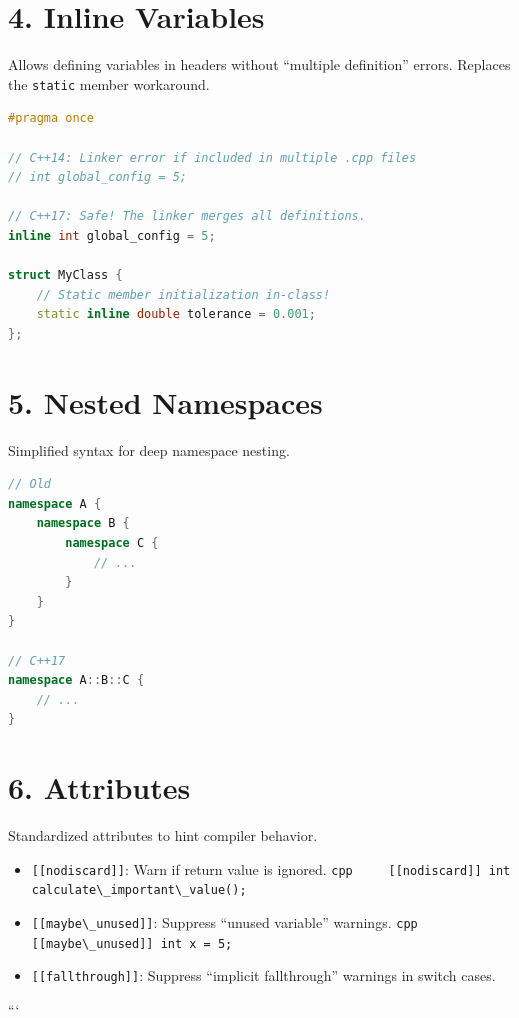 \hypertarget{inline-variables}{%
\section{4. Inline Variables}\label{inline-variables}}

Allows defining variables in headers without ``multiple definition''
errors. Replaces the \passthrough{\lstinline!static!} member workaround.

\begin{lstlisting}[language={C++}]
#pragma once

// C++14: Linker error if included in multiple .cpp files
// int global_config = 5; 

// C++17: Safe! The linker merges all definitions.
inline int global_config = 5; 

struct MyClass {
    // Static member initialization in-class!
    static inline double tolerance = 0.001;
};
\end{lstlisting}

\hypertarget{nested-namespaces}{%
\section{5. Nested Namespaces}\label{nested-namespaces}}

Simplified syntax for deep namespace nesting.

\begin{lstlisting}[language={C++}]
// Old
namespace A {
    namespace B {
        namespace C {
            // ...
        }
    }
}

// C++17
namespace A::B::C {
    // ...
}
\end{lstlisting}

\hypertarget{attributes}{%
\section{6. Attributes}\label{attributes}}

Standardized attributes to hint compiler behavior.

\begin{itemize}
\tightlist
\item
  \passthrough{\lstinline![[nodiscard]]!}: Warn if return value is
  ignored.
  \passthrough{\lstinline!cpp     [[nodiscard]] int calculate\_important\_value();!}
\item
  \passthrough{\lstinline![[maybe\_unused]]!}: Suppress ``unused
  variable'' warnings.
  \passthrough{\lstinline!cpp     [[maybe\_unused]] int x = 5;!}
\item
  \passthrough{\lstinline![[fallthrough]]!}: Suppress ``implicit
  fallthrough'' warnings in switch cases.
\end{itemize}

```
